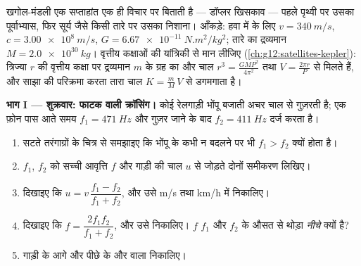\begin{problem}
\label{pb:g12:doppler-effect:1}
खगोल-मंडली एक सप्ताहांत एक ही विचार पर बिताती है --- डॉप्लर खिसकाव --- पहले
पृथ्वी पर उसका पूर्वाभ्यास, फिर सूर्य जैसे किसी तारे पर उसका निशाना। आँकड़े:
हवा में  के लिए $v = \qty{340}{m/s}$, $c = \qty{3.00e8}{m/s}$, $G = \qty{6.67e-11}{N.m^2/kg^2}$; तारे का द्रव्यमान
$M = \qty{2.0e30}{kg}$। वृत्तीय कक्षाओं की यांत्रिकी से मान लीजिए (\cref{ch:g12:satellites-kepler}): त्रिज्या
$r$ की वृत्तीय कक्षा पर द्रव्यमान $m$ के ग्रह का
 और चाल $r^3 = \frac{G M P^2}{4\pi^2}$ तथा $V = \frac{2\pi r}{P}$ से मिलते हैं, और साझा
 की परिक्रमा करता तारा चाल $K = \frac{m}{M}\,V$ से डगमगाता है।

\medskip
\noindent\textbf{भाग I --- शुक्रवार: फाटक वाली क्रॉसिंग।}
कोई रेलगाड़ी भोंपू बजाती अचर चाल से गुज़रती है; एक फ़ोन पास आते समय $f_1 = \qty{471}{Hz}$ और
गुज़र जाने के बाद $f_2 = \qty{411}{Hz}$ दर्ज करता है।
\begin{enumerate}
  \item सटते तरंगाग्रों के चित्र से समझाइए कि भोंपू के कभी न बदलने
        पर भी $f_1 > f_2$ क्यों होता है।
  \item $f_1$, $f_2$ को सच्ची आवृत्ति $f$ और गाड़ी की चाल
        $u$ से जोड़ते दोनों समीकरण लिखिए।
  \item दिखाइए कि $u = v\,\dfrac{f_1 - f_2}{f_1 + f_2}$, और उसे \unit{m/s} तथा \unit{km/h} में निकालिए।
  \item दिखाइए कि $f = \dfrac{2 f_1 f_2}{f_1 + f_2}$, और उसे निकालिए। $f$ $f_1$ और $f_2$ के औसत
        से थोड़ा \emph{नीचे} क्यों है?
  \item गाड़ी के आगे और पीछे के  और  वाला
         निकालिए।
\end{enumerate}


\end{problem}
